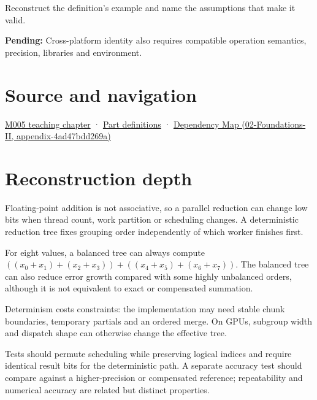 Reconstruct the definition's example and name the assumptions that make it valid.

\textbf{Pending:} Cross-platform identity also requires compatible operation semantics, precision, libraries and environment.

\section{Source and navigation}\label{appendix-4c8e0238e7ee-source-and-navigation}

\href{Continuous\%20Notes/Computing\%20Foundations\%20-\%20From\%20Bits\%20to\%20C++\%20and\%20Systems\%20APIs\#When\%20arithmetic\%20meets\%20uncertainty}{M005 teaching chapter} · \hyperref[appendix-fd090d982a15-m005---parts-77-88]{Part definitions} · \href{../02-Foundations-II/main.pdf\#nameddest=appendix-4ad47bdd269a}{Dependency Map (02-Foundations-II, appendix-4ad47bdd269a)}

\section{Reconstruction depth}\label{appendix-4c8e0238e7ee-reconstruction-depth}

Floating-point addition is not associative, so a parallel reduction can change low bits when thread count, work partition or scheduling changes. A deterministic reduction tree fixes grouping order independently of which worker finishes first.

For eight values, a balanced tree can always compute \(((x_0+x_1)+(x_2+x_3)) + ((x_4+x_5)+(x_6+x_7))\). The balanced tree can also reduce error growth compared with some highly unbalanced orders, although it is not equivalent to exact or compensated summation.

Determinism costs constraints: the implementation may need stable chunk boundaries, temporary partials and an ordered merge. On GPUs, subgroup width and dispatch shape can otherwise change the effective tree.

Tests should permute scheduling while preserving logical indices and require identical result bits for the deterministic path. A separate accuracy test should compare against a higher-precision or compensated reference; repeatability and numerical accuracy are related but distinct properties.
